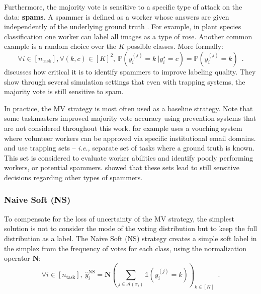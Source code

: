 Furthermore, the majority vote is sensitive to a specific type of attack on the data: \textbf{spams}.
A spammer is defined as a worker whose answers are given independently of the underlying ground truth \citep{raykar_ranking_2011}. For example, in plant species classification one worker can label all images as a type of rose. Another common example is a random choice over the $K$ possible classes. More formally:
\begin{equation}\label{eq:spammer}
    \forall i \in [n_\text{task}], \forall (k,c) \in [K]^2,\ \mathbb{P}(y_i^{(j)} = k\ | y_i^\star=c) = \mathbb{P}(y_i^{(j)} = k) \enspace.
\end{equation}
\citet{vuurens2011much} discusses how critical it is to identify spammers to improve labeling quality. They show through several simulation settings that even with trapping systems, the majority vote is still sensitive to spam.

In practice, the MV strategy is most often used as a baseline strategy.
Note that some taskmasters improved majority vote accuracy using prevention systems that are not considered throughout this work.
\citet{hoang2021tournesol} for example uses a vouching system where volunteer workers can be approved via specific institutional email domains.
\citet{khattak_toward_2017} and \citet{peterson_human_2019} use trapping sets -- \emph{i.e.,} separate set of tasks where a ground truth is known. This set is considered to evaluate worker abilities and identify poorly performing workers, or potential spammers. \citet{vuurens2011much} showed that these sets lead to still sensitive decisions regarding other types of spammers.

\subsubsection{Naive Soft (NS)}
\label{subsub:ns}

To compensate for the loss of uncertainty of the MV strategy, the simplest solution is not to consider the mode of the voting distribution but to keep the full distribution as a label.
The Naive Soft (NS) strategy creates a simple soft label in the simplex from the frequency of votes for each class, using the normalization operator $\mathbf{N}$:
\begin{equation}\label{eq:ns}
    \forall i\in [n_\text{task}],\ \hat y_i^{\mathrm{NS}} = \mathbf{N}\left(\sum_{j\in\mathcal{A}(x_i)} \mathds{1}(y_i^{(j)}=k)\right)_{k\in[K]} \enspace.
\end{equation}

